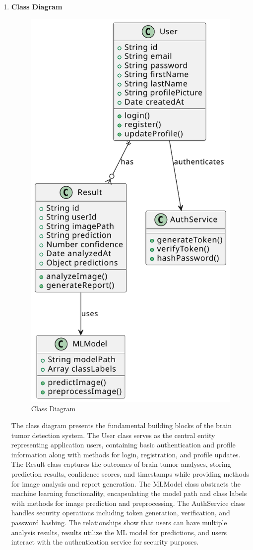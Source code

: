 \begin{enumerate}[label=\roman*.]
    \item \textbf{Class Diagram}
          \begin{center}
              \begin{figure}[H]
                  \centering
                  \includegraphics[width=0.4\linewidth]{Images/Highlevel/class.pdf}
                  \caption{Class Diagram}
                  \label{fig:ClassDiagram}
              \end{figure}
          \end{center}
          The class diagram presents the fundamental building blocks of the brain tumor detection system. The User class serves as the central entity representing application users, containing basic authentication and profile information along with methods for login, registration, and profile updates. The Result class captures the outcomes of brain tumor analyses, storing prediction results, confidence scores, and timestamps while providing methods for image analysis and report generation. The MLModel class abstracts the machine learning functionality, encapsulating the model path and class labels with methods for image prediction and preprocessing. The AuthService class handles security operations including token generation, verification, and password hashing. The relationships show that users can have multiple analysis results, results utilize the ML model for predictions, and users interact with the authentication service for security purposes.




\end{enumerate}
